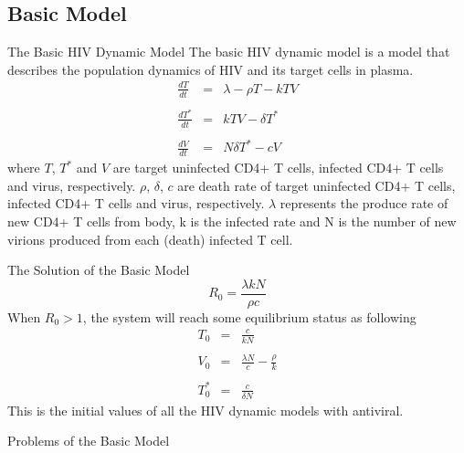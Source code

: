 \documentclass[9pt]{beamer}
\begin{document}
\subsection[Basic Model]{Basic Model}
\begin{frame}{The Basic HIV Dynamic Model}
The basic HIV dynamic model is a model that describes the population dynamics of HIV and its target cells in plasma.
\begin{equation}
\begin{array}{rcl}
\frac{dT}{dt} & = & \lambda{}-\rho{}T-kTV \\ \\
\frac{dT^{*}}{dt} & = & kTV-\delta{}T^{*} \\ \\
\frac{dV}{dt} & = & N\delta{}T^{*}-cV
\end{array}
\end{equation}
where $T$, $T^{*}$ and $V$ are target uninfected CD4+ T cells, infected CD4+ T cells and virus, respectively.  $\rho$, $\delta$, $c$ are death rate of target uninfected CD4+ T cells, infected CD4+ T cells and virus, respectively. $\lambda$ represents the produce rate of new CD4+ T cells from body, k is the infected rate and N is the number of new virions produced from each (death) infected T cell.
\end{frame}

\begin{frame}{The Solution of the Basic Model}
\begin{equation}
R_{0}=\frac{\lambda{}kN}{\rho{}c}
\end{equation}
When $R_{0}>1$, the system will reach some equilibrium status as following
\begin{equation}
\begin{array}{rcl}
T_{0} & = & \frac{c}{kN} \\ \\
V_{0} & = & \frac{\lambda{}N}{c}-\frac{\rho}{k} \\ \\
T_{0}^{*} & = & \frac{c}{\delta{}N}
\end{array}
\end{equation}
This is the initial values of all the HIV dynamic models with antiviral. 
\end{frame}

\begin{frame}{Problems of the Basic Model}

\end{frame}
\end{document}
